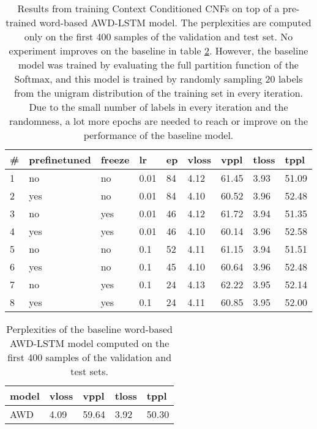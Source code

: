 \begin{table}
\centering
\caption{Results from training Context Conditioned CNFs on top of a pre-trained word-based AWD-LSTM model. The perplexities are computed only on the first 400 samples of the validation and test set. No experiment improves on the baseline in table \ref{table:experiments:awd_mini_eval}. However, the baseline model was trained by evaluating the full partition function of the Softmax, and this model is trained by randomly sampling 20 labels from the unigram distribution of the training set in every iteration. Due to the small number of labels in every iteration and the randomness, a lot more epochs are needed to reach or improve on the performance of the baseline model.}

\begin{tabular}{|l|l|l|l|l|l|l|l|l|}
\hline
\textbf{\#} & \textbf{prefinetuned} & \textbf{freeze} & \textbf{lr} & \textbf{ep} & \textbf{vloss} & \textbf{vppl} & \textbf{tloss} & \textbf{tppl} \\ \hline
1       & no        & no        & 0.01      & 84        & 4.12      & 61.45     & 3.93      & 51.09 \\ \hline
2       & yes       & no        & 0.01      & 84        & 4.10      & 60.52     & 3.96      & 52.48 \\ \hline
3       & no        & yes       & 0.01      & 46        & 4.12      & 61.72     & 3.94      & 51.35 \\ \hline
4       & yes       & yes       & 0.01      & 46        & 4.10      & 60.14     & 3.96      & 52.58 \\ \hline
5       & no        & no        & 0.1       & 52        & 4.11      & 61.15     & 3.94      & 51.51 \\ \hline
6       & yes       & no        & 0.1       & 45        & 4.10      & 60.64     & 3.96      & 52.48 \\ \hline
7       & no        & yes       & 0.1       & 24        & 4.13      & 62.22     & 3.95      & 52.14 \\ \hline
8       & yes       & yes       & 0.1       & 24        & 4.11      & 60.85     & 3.95      & 52.00 \\ \hline
\end{tabular}
\label{table:experiments:cnfh_word}
\end{table}

\begin{table}
\centering
\caption{Perplexities of the baseline word-based AWD-LSTM model computed on the first 400 samples of the validation and test sets.}
\begin{tabular}{|l|l|l|l|l|}
\hline
\textbf{model} & \textbf{vloss} & \textbf{vppl}  & \textbf{tloss} & \textbf{tppl}  \\ \hline
AWD   & 4.09  & 59.64 & 3.92  & 50.30 \\ \hline
\end{tabular}
\label{table:experiments:awd_mini_eval}
\end{table}

